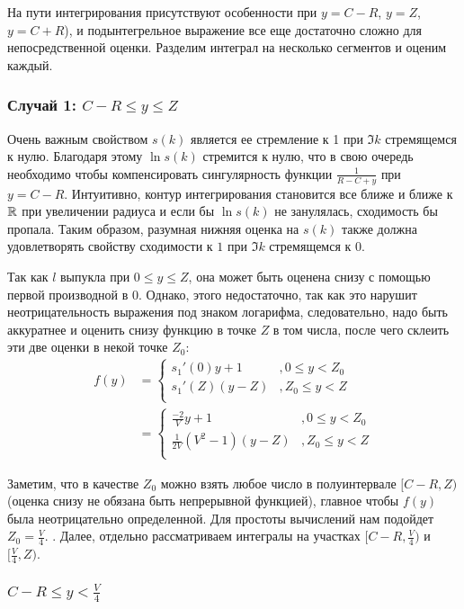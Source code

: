 На пути интегрирования присутствуют особенности при $y = C - R$, $y = Z$, $y = C + R$), и подынтегрельное выражение все еще достаточно сложно для непосредственной оценки. Разделим интеграл на несколько сегментов и оценим каждый.

\subsubsection{Случай 1: $C - R \le y \le Z$}
Очень важным свойством $s(k)$ является ее стремление к 1 при $\Im k$ стремящемся к нулю. Благодаря этому $\ln s(k)$ стремится к нулю, что в свою очередь необходимо чтобы компенсировать сингулярность функции $\frac{1}{R - C + y}$ при $y = C - R$. Интуитивно, контур интегрирования становится все ближе и ближе к $\mathbb{R}$ при увеличении радиуса и если бы $\ln s(k)$ не занулялась, сходимость бы пропала. Таким образом, разумная нижняя оценка на $s(k)$ также должна удовлетворять свойству сходимости к $1$ при $\Im k$ стремящемся к $0$.

Так как $l$ выпукла при $0 \le y \le Z$, она может быть оценена снизу с помощью первой производной в $0$. Однако, этого недостаточно, так как это нарушит неотрицательность выражения под знаком логарифма, следовательно, надо быть аккуратнее и оценить снизу функцию в точке $Z$ в том числа, после чего склеить эти две оценки в некой точке $Z_0$:
\begin{align*}
f(y)
& = 
\begin{cases}
s_1'(0) y + 1   &, 0 \le y < Z_0  \\
s_1'(Z) (y - Z) &, Z_0 \le y < Z \\
\end{cases}
\\
& =
\begin{cases}
\frac{-2}{V} y + 1   &, 0 \le y < Z_0  \\
\frac{1}{2 V}(V^2 - 1) (y - Z) &, Z_0 \le y < Z \\
\end{cases}
\end{align*}

Заметим, что в качестве $Z_0$ можно взять любое число в полуинтервале $[C-R, Z)$ (оценка снизу не обязана быть непрерывной функцией), главное чтобы $f(y)$ была неотрицательно определенной. Для простоты вычислений нам подойдет $Z_0 = \frac{V}{4}$. . Далее, отдельно рассматриваем интегралы на участках $[C - R, \frac{V}{4})$ и $[\frac{V}{4}, Z)$.

\subsubsection{$C - R \le y < \frac{V}{4}$}

